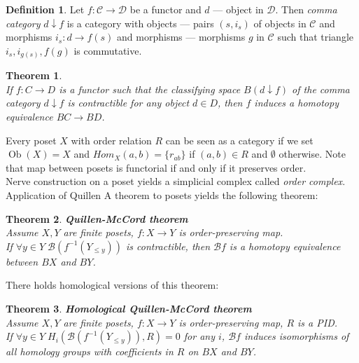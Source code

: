 \documentclass[a4paper, 12pt]{article}
\newtheorem{theorem}{Theorem}
\theoremstyle{definition}
\newtheorem{definition}{Definition}
\theoremstyle{remark}
\newcommand{\define}[1]{{\textit{#1}}}
\begin{document}
\begin{definition}
  Let $f: \mathcal{C} \to \mathcal{D}$ be a functor and $d$ --- object in $\mathcal{D}$. Then \define{comma category} $d \downarrow f$ is a category with objects --- pairs $(s,i_s)$ of objects in $\mathcal{C}$ and morphisms $i_s : d \to f(s)$ and morphisms --- morphisms $g$ in $\mathcal{C}$ such that triangle $i_s, i_{g(s)}, f(g)$ is commutative.
\end{definition}

\begin{theorem} {\cite[Theorem A]{Quillen72}}\\
  If $f: C \to D$ is a functor such that the classifying space $B(d \downarrow f)$ of the comma category $d \downarrow f$ is contractible for any object $d \in D$, then $f$ induces a homotopy equivalence $BC \to BD$.
\end{theorem}

Every poset $X$ with order relation $R$ can be seen as a category if we set $\operatorname{Ob}(X) = X$ and $Hom_X(a,b) = \{r_{ab}\}$ if $(a,b) \in R$ and $\emptyset$ otherwise. Note that map between posets is functorial if and only if it preserves order.\\
Nerve construction on a poset yields a simplicial complex called \define{order complex}. Application of Quillen A theorem to posets yields the following theorem:

\begin{theorem} \textbf{Quillen-McCord theorem}\\
  Assume $X, Y$ are finite posets, $f : X \to Y$ is order-preserving map.\\
  If $\forall y \in Y\;\mathcal{B}(f^{-1}(Y_{\leqslant y}))$ is contractible, then $\mathcal{B}f$ is a homotopy equivalence between $BX$ and $BY$.\\
\end{theorem}

There holds homological {\cite[Corollary 5.5]{Bar11}} versions of this theorem:

\begin{theorem} \textbf{Homological Quillen-McCord theorem}\\
  Assume $X, Y$ are finite posets, $f : X \to Y$ is order-preserving map, $R$ is a PID.\\
  If $\forall y \in Y\;H_i(\mathcal{B}(f^{-1}(Y_{\leqslant y})),R) = 0$ for any $i$, $\mathcal{B}f$ induces isomorphisms of all homology groups with coefficients in $R$ on $BX$ and $BY$.\\
\end{theorem}
\end{document}
